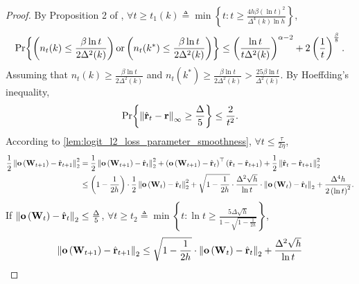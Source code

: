 \begin{proof}
    By Proposition 2 of \citep{seldin2017improved},
    $\forall t \ge t_1(k) \triangleq \min{\left\{ t : t \ge \frac{4 h \beta \left(\ln{t}\right)^2}{\Delta^4(k) \ln{h}} \right\}}$,
\begin{equation*}
\begin{split}
    {\text{Pr}}{\left\{ \left( n_t(k) \le \frac{\beta \ln{t}}{2 \Delta^2(k)} \right) \text{or} \left( n_t(k^*) \le \frac{\beta \ln{t}}{2 \Delta^2(k)} \right) \right\}} \le \left( \frac{\ln{t}}{t \Delta^2(k)} \right)^{\alpha - 2} + 2 \left(\frac{1}{t}\right)^{\frac{\beta}{8}}.
\end{split}
\end{equation*}
Assuming that $n_t(k) \ge \frac{\beta \ln{t}}{2 \Delta^2(k)}$ and $n_t(k^*) \ge \frac{\beta \ln{t}}{2 \Delta^2(k)} > \frac{25 \beta \ln{t}}{\Delta^2(k)}$. By Hoeffding's inequality,
\begin{equation*}
\begin{split}
    {\text{Pr}}{\left\{ \left\| \hat{{\mathbf{r}}}_t - {\mathbf{r}}\right\|_\infty \ge \frac{\Delta}{5} \right\}} \le \frac{2}{t^2}.
\end{split}
\end{equation*}
According to \cref{lem:logit_l2_loss_parameter_smoothness}, $\forall t \le \frac{\tau}{2 \eta}$,
\begin{equation*}
\begin{split}
    \frac{1}{2} \left\| {\mathbf{o}}\left( {\mathbf{W}}_{t+1} \right) - \hat{{\mathbf{r}}}_{t+1}\right\|_2^2 &= \frac{1}{2} \left\| {\mathbf{o}}\left( {\mathbf{W}}_{t+1} \right) - \hat{{\mathbf{r}}}_t\right\|_2^2 + \left( {\mathbf{o}}\left( {\mathbf{W}}_{t+1} \right) - \hat{{\mathbf{r}}}_t \right)^\top \left( \hat{{\mathbf{r}}}_t - \hat{{\mathbf{r}}}_{t+1} \right) + \frac{1}{2} \left\| \hat{{\mathbf{r}}}_t - \hat{{\mathbf{r}}}_{t+1} \right\|_2^2 \\
    &\le \left( 1 - \frac{1}{2 h} \right) \cdot \frac{1}{2} \left\| {\mathbf{o}}\left( {\mathbf{W}}_t \right) - \hat{{\mathbf{r}}}_t\right\|_2^2 + \sqrt{1 - \frac{1}{2 h} } \cdot \frac{\Delta^2 \sqrt{h}}{\ln{t}} \cdot \left\| {\mathbf{o}}\left( {\mathbf{W}}_t \right) - \hat{{\mathbf{r}}}_t\right\|_2 + \frac{\Delta^4 h}{2 \left( \ln{t} \right)^2 }.
\end{split}
\end{equation*}
If $\left\| {\mathbf{o}}\left( {\mathbf{W}}_t \right) - \hat{{\mathbf{r}}}_t\right\|_2 \le \frac{\Delta}{5}$, $\forall t \ge t_2 \triangleq \min\left\{ t: \ln{t} \ge \frac{5 \Delta \sqrt{h}}{1 - \sqrt{1 - \frac{1}{2 h}}} \right\}$,
\begin{equation*}
\begin{split}
    \left\| \rvo\left( \rmW_{t+1} \right) - \hat{\rvr}_{t+1}\right\|_2 &\le \sqrt{1 - \frac{1}{2 h}} \cdot \left\| \rvo\left( \rmW_t \right) - \hat{\rvr}_t\right\|_2 + \frac{\Delta^2 \sqrt{h}}{\ln{t}} \\

\end{split}
\end{equation*}
\end{proof}
